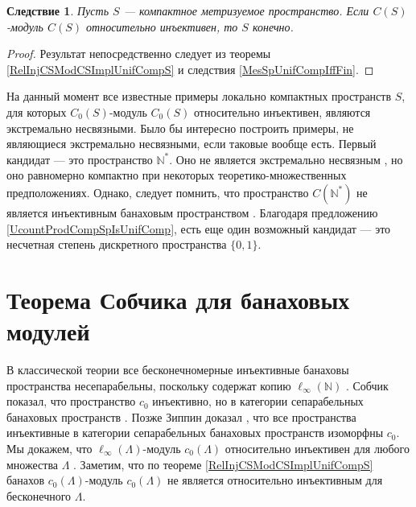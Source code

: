 \documentclass[12pt]{article}
\newtheorem{corollary}[theorem]{Следствие}
\begin{document}
\begin{corollary}\label{CSModCSRelInjImplSHasNoConvSeq} Пусть $S$ --- компактное метризуемое пространство. Если $C(S)$-модуль $C(S)$ относительно инъективен, то $S$ конечно.
\end{corollary}
\begin{proof} Результат непосредственно следует из теоремы \ref{RelInjCSModCSImplUnifCompS} и следствия \ref{MesSpUnifCompIffFin}.
\end{proof}

На данный момент все известные примеры локально компактных пространств $S$, для которых $C_0(S)$-модуль $C_0(S)$ относительно инъективен, являются экстремально несвязными. Было бы интересно построить примеры, не являющиеся экстремально несвязными, если таковые вообще есть. Первый кандидат --- это пространство $\mathbb{N}^*$. Оно не является экстремально несвязным \cite[пример 6.2.31]{EngkingGenTop}, но оно равномерно компактно при некоторых теоретико-множественных предположениях. Однако, следует помнить, что пространство $C(\mathbb{N}^*)$ не является инъективным банаховым пространством \cite[следствие 2]{AmirProjContFuncSp}. Благодаря предложению \ref{UcountProdCompSpIsUnifComp}, есть еще один возможный кандидат --- это несчетная степень дискретного пространства $\{0, 1\}$.


\section{Теорема Собчика для банаховых модулей}
\label{SectionExamples}

В классической теории все бесконечномерные инъективные банаховы пространства несепарабельны, поскольку содержат копию $\ell_\infty(\mathbb{N})$ \cite[следствие 1.1.4]{RosOnRelDisjFamOfMeas}. Собчик показал, что пространство $c_0$ инъективно, но в категории сепарабельных банаховых пространств \cite[теорема 5]{SobProjmOnc0}. Позже Зиппин доказал \cite{ZipSepExtProbm}, что все пространства инъективные в категории сепарабельных банаховых пространств изоморфны $c_0$.  Мы докажем, что $\ell_\infty(\Lambda)$-модуль $c_0(\Lambda)$ относительно инъективен для любого множества $\Lambda$ .
Заметим, что по теореме \ref{RelInjCSModCSImplUnifCompS} банахов $c_0(\Lambda)$-модуль $c_0(\Lambda)$ не является относительно инъективным для бесконечного $\Lambda$.
\end{document}
